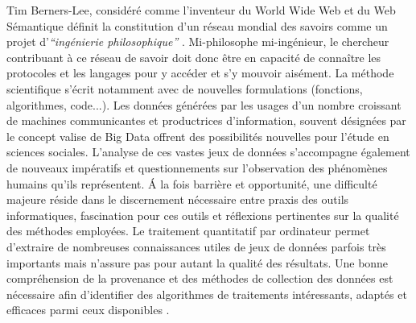 Tim Berners-Lee, considéré comme l{\textquoteright}inventeur du World Wide Web et du Web Sémantique définit la constitution d{\textquoteright}un réseau mondial des savoirs comme un projet d{\textquoteright}\textit{{\textquotedblleft}ingénierie philosophique{\textquotedblright} }\citep{Halpin2014}. Mi-philosophe mi-ingénieur, le chercheur contribuant à ce réseau de savoir doit donc \^etre en capacité de conna\^itre les protocoles et les langages pour y accéder et s{\textquoteright}y mouvoir aisément. La méthode scientifique s{\textquoteright}écrit notamment avec de nouvelles formulations (fonctions, algorithmes, code...). Les données générées par les usages d{\textquoteright}un nombre croissant de machines communicantes et productrices d{\textquoteright}information, souvent désignées par le concept {\guillemotleft} valise {\guillemotright} de Big Data \citep{Lohr2012} offrent des possibilités nouvelles pour l{\textquoteright}étude en sciences sociales. L{\textquoteright}analyse de ces vastes jeux de données s{\textquoteright}accompagne également de nouveaux impératifs et questionnements sur l{\textquoteright}observation des phénomènes humains qu{\textquoteright}ils représentent. \'A la fois barrière et opportunité, une difficulté majeure réside dans le discernement nécessaire entre praxis des outils informatiques, fascination pour ces outils et réflexions pertinentes sur la qualité des méthodes employées. Le traitement quantitatif par ordinateur permet d{\textquoteright}extraire de nombreuses connaissances utiles de jeux de données parfois très importants mais n{\textquoteright}assure pas pour autant la qualité des résultats. Une bonne compréhension de la provenance et des méthodes de collection des données est nécessaire afin d{\textquoteright}identifier des algorithmes de traitements intéressants, adaptés et efficaces parmi ceux disponibles \citep{Rajaraman2011}. 

